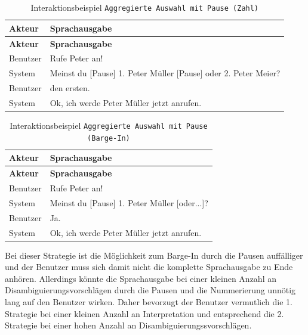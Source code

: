\documentclass[12pt,a4paper]{scrartcl}
\begin{document}
\begin{longtable}{p{6cm}p{8cm}}
	\caption[Interaktionsbeispiel \texttt{Aggregierte Auswahl mit Pause (Zahl)}]{Interaktionsbeispiel \texttt{Aggregierte Auswahl mit Pause (Zahl)}}\\
	\hline
	\textbf{Akteur} &	\textbf{Sprachausgabe}\\
	\hline
	\endfirsthead
	\hline
	\textbf{Akteur} &	\textbf{Sprachausgabe}\\
	\hline
	\endhead
Benutzer & Rufe Peter an!\\
System & Meinst du [Pause] 1. Peter Müller [Pause] oder 2. Peter Meier?\\
Benutzer & den ersten.\\
System & Ok, ich werde Peter Müller jetzt anrufen.\\

\hline
\end{longtable}

\begin{longtable}{p{6cm}p{8cm}}
	\caption[Interaktionsbeispiel \texttt{Aggregierte Auswahl mit Pause (Barge-In)}]{Interaktionsbeispiel \texttt{Aggregierte Auswahl mit Pause (Barge-In)}}\\
	\hline
	\textbf{Akteur} &	\textbf{Sprachausgabe}\\
	\hline
	\endfirsthead
	\hline
	\textbf{Akteur} &	\textbf{Sprachausgabe}\\
	\hline
	\endhead
Benutzer & Rufe Peter an!\\
System & Meinst du [Pause] 1. Peter Müller [oder...]?\\
Benutzer & Ja.\\
System & Ok, ich werde Peter Müller jetzt anrufen.\\

\hline
\end{longtable}

Bei dieser Strategie ist die Möglichkeit zum Barge-In durch die Pausen auffälliger und der Benutzer muss sich damit nicht die komplette Sprachausgabe zu Ende anhören. Allerdings könnte die Sprachausgabe bei einer kleinen Anzahl an Disambiguierungsvorschlägen durch die Pausen und die Nummerierung unnötig lang auf den Benutzer wirken. Daher bevorzugt der Benutzer vermutlich die 1. Strategie bei einer kleinen Anzahl an Interpretation und entsprechend die 2. Strategie bei einer hohen Anzahl an Disambiguierungssvorschlägen.
\end{document}
